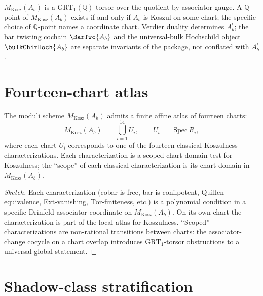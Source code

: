 \begin{remark}
$M_{\mathrm{Kosz}}(A_b)$ is a $\mathrm{GRT}_1(\mathbb{Q})$-torsor over
the quotient by associator-gauge. A $\mathbb{Q}$-point of
$M_{\mathrm{Kosz}}(A_b)$ exists if and only if $A_b$ is Koszul on some
chart; the specific choice of $\mathbb{Q}$-point names a coordinate
chart. Verdier duality determines $A_b^{!}$; the bar twisting cochain
$\BarTwc{A_b}$ and the universal-bulk Hochschild object
$\bulkChirHoch{A_b}$ are separate invariants of the package, not
conflated with $A_b^{!}$.
\end{remark}

\section{Fourteen-chart atlas}
\label{sec:mkosz-fourteen-charts}

\begin{theorem}
\label{thm:mkosz-fourteen-charts}
The moduli scheme $M_{\mathrm{Kosz}}(A_b)$ admits a finite affine
atlas of fourteen charts:
\[
 M_{\mathrm{Kosz}}(A_b)
 \;=\;
 \bigcup_{i=1}^{14} U_i,
 \qquad
 U_i \;=\; \mathrm{Spec}\,R_i,
\]
where each chart $U_i$ corresponds to one of the fourteen classical
Koszulness characterizations. Each characterization is a scoped
chart-domain test for Koszulness; the ``scope'' of each classical
characterization is its chart-domain in
$M_{\mathrm{Kosz}}(A_b)$.
\end{theorem}

\begin{proof}[Sketch]
Each characterization (cobar-is-free, bar-is-conilpotent, Quillen
equivalence, Ext-vanishing, $\mathrm{Tor}$-finiteness, etc.) is a
polynomial condition in a specific Drinfeld-associator coordinate
on $M_{\mathrm{Kosz}}(A_b)$. On its own chart the characterization is
part of the local atlas for Koszulness. ``Scoped'' characterizations
are non-rational transitions between charts: the associator-change
cocycle on a chart overlap introduces $\mathrm{GRT}_1$-torsor
obstructions to a universal global statement.
\end{proof}

\section{Shadow-class stratification}
\label{sec:mkosz-shadow-stratification}

